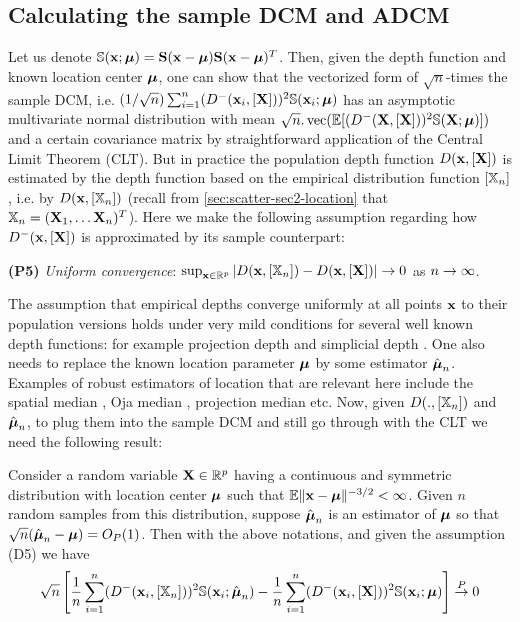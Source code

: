 \subsection{Calculating the sample DCM and ADCM}
Let us denote ${\mathbb{S}} ({\bf{x}}; {\boldsymbol{\mu}}) = {\mathbf{S}}({\bf{x}} - {\boldsymbol{\mu}}) {\mathbf{S}}({\bf{x}} - {\boldsymbol{\mu}})^T$. Then, given the depth function and known location center ${\boldsymbol{\mu}}$, one can show that the vectorized form of $\sqrt n$-times the sample DCM, i.e. $(1/\sqrt n) \sum_{i=1}^n (D^- ({\bf{x}}_i, [{\mathbf{X}}]))^2 {\mathbb{S}}({\bf{x}}_i; {\boldsymbol{\mu}})$  has an asymptotic multivariate normal distribution with mean $\sqrt n. \operatorname*{vec} ( {\mathbb{E}}[ (D^- ({\mathbf{X}}, [{\mathbf{X}}]))^2 {\mathbb{S}}({\mathbf{X}}; {\boldsymbol{\mu}})])$ and a certain covariance matrix by straightforward application of the Central Limit Theorem (CLT). But in practice the population depth function $D ({\bf{x}}, [{\mathbf{X}}])$ is estimated by the depth function based on the empirical distribution function $[ {\mathbb{X}}_n ]$, i.e. by $D ({\bf{x}}, [{\mathbb{X}}_n])$ (recall from \ref{sec:scatter-sec2-location} that ${\mathbb{X}}_n = ({\mathbf{X}}_1, \ldots {\mathbf{X}}_n)^T$). Here we make the following assumption regarding how $D^- ({\bf{x}}, [{\mathbf{X}}])$ is approximated by its sample counterpart:

\vspace{1em}
\noindent\textbf{(P5)} \textit{Uniform convergence}: $\sup_{{\bf{x}} \in \mathbb R^p} | D ({\bf{x}}, [{\mathbb{X}}_n]) - D ({\bf{x}}, [{\mathbf{X}}]) | \rightarrow 0$ as $n \rightarrow \infty $.
\vspace{1em}

The assumption that empirical depths converge uniformly at all points ${\bf{x}}$ to their population versions holds under very mild conditions for several well known depth functions: for example projection depth \citep{zuo03} and simplicial depth \citep{Dumbgen92}. One also needs to replace the known location parameter ${\boldsymbol{\mu}}$ by some estimator $\hat{{\boldsymbol{\mu}}}_n$. Examples of robust estimators of location that are relevant here include the spatial median \citep{haldane48,brown83}, Oja median \citep{oja83}, projection median \citep{zuo03} etc. Now, given $D (., [{\mathbb{X}}_n])$ and $\hat {{\boldsymbol{\mu}}}_n$, to plug them into the sample DCM and still go through with the CLT we need the following result:

\begin{Lemma} \label{Lemma:lemma1}
Consider a random variable ${\mathbf{X}} \in \mathbb{R}^p$ having a continuous and symmetric distribution with location center ${\boldsymbol{\mu}}$ such that $ {\mathbb{E}} \|{\bf{x}} - {\boldsymbol{\mu}} \|^{-3/2} < \infty$. Given $n$ random samples from this distribution, suppose $\hat{{\boldsymbol{\mu}}}_n$ is an estimator of ${\boldsymbol{\mu}}$ so that $\sqrt n (\hat{{\boldsymbol{\mu}}}_n - {\boldsymbol{\mu}}) = O_P(1) $. Then with the above notations, and given the assumption (D5) we have
%
$$ \sqrt n \left[
\frac{1}{n} \sum_{i=1}^n (D^- ({\bf{x}}_i, [{\mathbb{X}}_n]))^2 {\mathbb{S}}({\bf{x}}_i; \hat{{\boldsymbol{\mu}}}_n) -
\frac{1}{n} \sum_{i=1}^n (D^- ({\bf{x}}_i, [{\mathbf{X}}]))^2 {\mathbb{S}}({\bf{x}}_i; {\boldsymbol{\mu}}) \right]
\stackrel{P}{\rightarrow} 0 $$
\end{Lemma}


